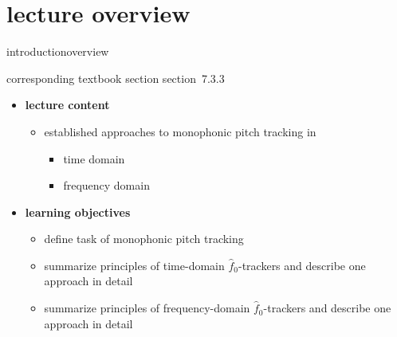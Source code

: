 


\subtitle{module 7.3.3: fundamental frequency detection in monophonic signals}


	

    \section[overview]{lecture overview}
        \begin{frame}{introduction}{overview}
            \begin{block}{corresponding textbook section}
                    section~7.3.3
            \end{block}

            \begin{itemize}
                \item   \textbf{lecture content}
                    \begin{itemize}
                        \item   established approaches to monophonic pitch tracking in
                            \begin{itemize}
                                \item   time domain
                                \item   frequency domain
                            \end{itemize}
                    \end{itemize}
                \bigskip
                \item<2->   \textbf{learning objectives}
                    \begin{itemize}
                        \item   define task of monophonic pitch tracking
                        \item   summarize principles of time-domain $\hat{f}_0$-trackers and describe one approach in detail
                        \item   summarize principles of frequency-domain $\hat{f}_0$-trackers and describe one approach in detail
                    \end{itemize}
            \end{itemize}
        \end{frame}

